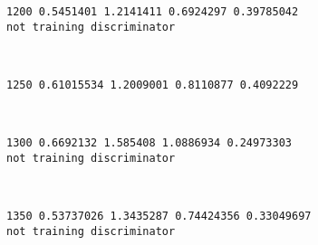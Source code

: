 \documentclass[11pt]{article}
\begin{document}
    \begin{Verbatim}[commandchars=\\\{\}]
1200 0.5451401 1.2141411 0.6924297 0.39785042
not training discriminator

    \end{Verbatim}

    \begin{center}
    \end{center}
    { \hspace*{\fill} \\}
    
    \begin{Verbatim}[commandchars=\\\{\}]
1250 0.61015534 1.2009001 0.8110877 0.4092229

    \end{Verbatim}

    \begin{center}
    \end{center}
    { \hspace*{\fill} \\}
    
    \begin{Verbatim}[commandchars=\\\{\}]
1300 0.6692132 1.585408 1.0886934 0.24973303
not training discriminator

    \end{Verbatim}

    \begin{center}
    \end{center}
    { \hspace*{\fill} \\}
    
    \begin{Verbatim}[commandchars=\\\{\}]
1350 0.53737026 1.3435287 0.74424356 0.33049697
not training discriminator

    \end{Verbatim}

    \begin{center}
    \end{center}
    { \hspace*{\fill} \\}
    
\end{document}
